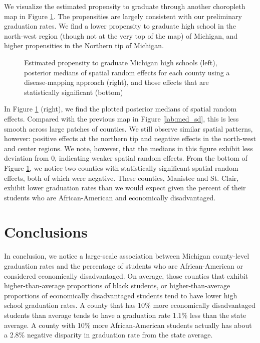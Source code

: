 \documentclass[12pt,letterpaper]{article}
\begin{document}
We visualize the estimated propensity to graduate through another choropleth map in Figure \ref{lab:post_med_poi}. The propensities are largely consistent with our preliminary graduation rates. We find a lower propensity to graduate high school in the north-west region (though not at the very top of the map) of Michigan, and higher propensities in the Northern tip of Michigan. 

\begin{figure}[h!]
\caption{Estimated propensity to graduate Michigan high schools (left), posterior medians of spatial random effects for each county using a disease-mapping approach (right), and those effects that are statistically significant (bottom)}
\centering
\begin{minipage}{.5\textwidth}
  \centering
  \scalebox{.81}{
 \trimbox{1cm 2cm 0cm 0cm}{}
 }
\end{minipage}%
\begin{minipage}{.5\textwidth}
  \centering
  \scalebox{.81}{
 \trimbox{0cm 2cm -1cm 0cm}{}
 }
\end{minipage}

\begin{minipage}{.5\textwidth}
  \centering
  \scalebox{.81}{
 \trimbox{0cm 2cm -1cm 0cm}{}
 }
\end{minipage}
\label{lab:post_med_poi}
\end{figure}

In Figure \ref{lab:post_med_poi} (right), we find the plotted posterior medians of spatial random effects. Compared with the previous map in Figure \ref{lab:med_sd}, this is less smooth across large patches of counties. We still observe similar spatial patterns, however: positive effects at the northern tip and negative effects in the north-west and center regions. We note, however, that the medians in this figure exhibit less deviation from 0, indicating weaker spatial random effects. From the bottom of Figure \ref{lab:post_med_poi}, we notice two counties with statistically significant spatial random effects, both of which were negative. These counties, Manistee and St. Clair, exhibit lower graduation rates than we would expect given the percent of their students who are African-American and economically disadvantaged.

\section{Conclusions}
In conclusion, we notice a large-scale association between Michigan county-level graduation rates and the percentage of students who are African-American or considered economically disadvantaged. On average, those counties that exhibit higher-than-average proportions of black students, or higher-than-average proportions of economically disadvantaged students tend to have lower high school graduation rates. A county that has 10\% more economically disadvantaged students than average tends to have a graduation rate 1.1\% less than the state average. A county with 10\% more African-American students actually has about a 2.8\% negative disparity in graduation rate from the state average.
\end{document}
